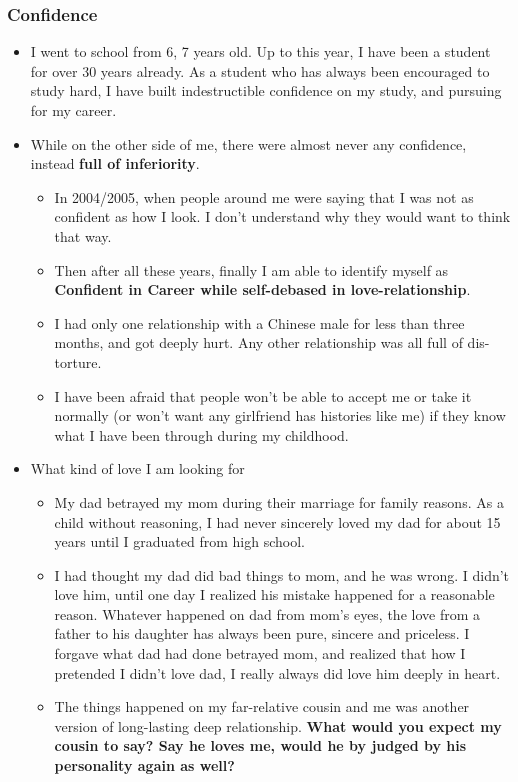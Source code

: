 \documentclass[9pt,b5paper]{article}
\begin{document}
\subsubsection{Confidence}
\label{sec-9-2-1}
\begin{itemize}
\item I went to school from 6, 7 years old. Up to this year, I have been a student for over 30 years already. As a student who has always been encouraged to study hard, I have built indestructible confidence on my study, and pursuing for my career.
\item While on the other side of me, there were almost never any confidence, instead \textbf{full of inferiority}. 
\begin{itemize}
\item In 2004/2005, when people around me were saying that I was not as confident as how I look. I don't understand why they would want to think that way.
\item Then after all these years, finally I am able to identify myself as \textbf{Confident in Career while self-debased in love-relationship}.
\item I had only one relationship with a Chinese male for less than three months, and got deeply hurt. Any other relationship was all full of dis-torture.
\item I have been afraid that people won't be able to accept me or take it normally (or won't want any girlfriend has histories like me) if they know what I have been through during my childhood.
\end{itemize}
\item What kind of love I am looking for
\begin{itemize}
\item My dad betrayed my mom during their marriage for family reasons. As a child without reasoning, I had never sincerely loved my dad for about 15 years until I graduated from high school.
\item I had thought my dad did bad things to mom, and he was wrong. I didn't love him, until one day I realized his mistake happened for a reasonable reason. Whatever happened on dad from mom's eyes, the love from a father to his daughter has always been pure, sincere and priceless. I forgave what dad had done betrayed mom, and realized that how I pretended I didn't love dad, I really always did love him deeply in heart.
\item The things happened on my far-relative cousin and me was another version of long-lasting deep relationship. \textbf{What would you expect my cousin to say? Say he loves me, would he by judged by his personality again as well?}
\end{itemize}
\end{itemize}
\end{document}
